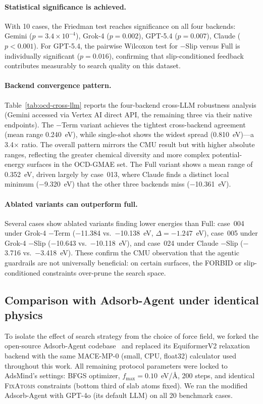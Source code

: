 \paragraph{Statistical significance is achieved.}
With 10 cases, the Friedman test reaches significance on all four backends: Gemini ($p = 3.4 \times 10^{-4}$), Grok-4 ($p = 0.002$), GPT-5.4 ($p = 0.007$), Claude ($p < 0.001$).
For GPT-5.4, the pairwise Wilcoxon test for $-$Slip versus Full is individually significant ($p = 0.016$), confirming that slip-conditioned feedback contributes measurably to search quality on this dataset.

\paragraph{Backend convergence pattern.}
Table~\ref{tab:ocd-cross-llm} reports the four-backend cross-LLM robustness analysis (Gemini accessed via Vertex AI direct API, the remaining three via their native endpoints).
The $-$Term variant achieves the tightest cross-backend agreement (mean range 0.240~eV), while single-shot shows the widest spread (0.810~eV)---a 3.4$\times$ ratio.
The overall pattern mirrors the CMU result but with higher absolute ranges, reflecting the greater chemical diversity and more complex potential-energy surfaces in the OCD-GMAE set.
The Full variant shows a mean range of 0.352~eV, driven largely by case~013, where Claude finds a distinct local minimum ($-$9.320~eV) that the other three backends miss ($-$10.361~eV).

\paragraph{Ablated variants can outperform full.}
Several cases show ablated variants finding lower energies than Full: case~004 under Grok-4 $-$Term ($-$11.384 vs.\ $-$10.138~eV, $\Delta = -1.247$~eV), case~005 under Grok-4 $-$Slip ($-$10.643 vs.\ $-$10.118~eV), and case~024 under Claude $-$Slip ($-$3.716 vs.\ $-$3.418~eV).
These confirm the CMU observation that the agentic guardrails are not universally beneficial: on certain surfaces, the FORBID or slip-conditioned constraints over-prune the search space.

\subsection{Comparison with Adsorb-Agent under identical physics}

To isolate the effect of search strategy from the choice of force field, we forked the open-source Adsorb-Agent codebase~\cite{adsorbagent} and replaced its EquiformerV2 relaxation backend with the same MACE-MP-0 (small, CPU, float32) calculator used throughout this work.
All remaining protocol parameters were locked to AdsMind's settings: BFGS optimizer, $f_\mathrm{max} = 0.10$~eV/\AA, 200 steps, and identical \textsc{FixAtoms} constraints (bottom third of slab atoms fixed).
We ran the modified Adsorb-Agent with GPT-4o (its default LLM) on all 20 benchmark cases.

